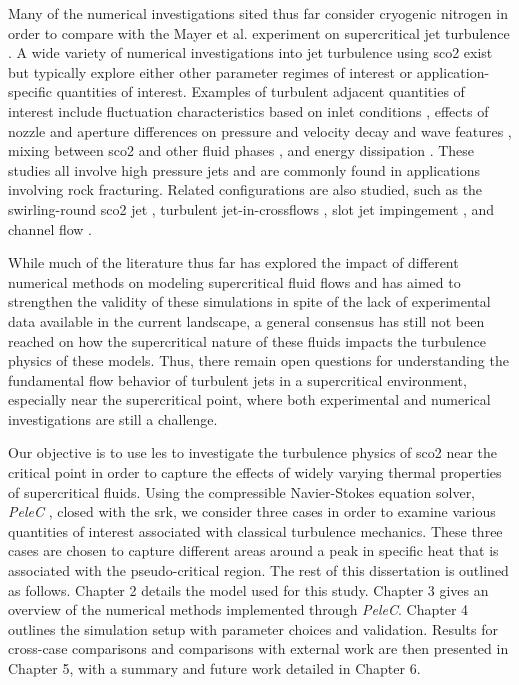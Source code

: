 Many of the numerical investigations sited thus far consider cryogenic nitrogen in order to compare with the Mayer et al. experiment on supercritical jet turbulence \cite{mayer2003raman}. A wide variety of numerical investigations into jet turbulence using \gls{sco2} exist but typically explore either other parameter regimes of interest or application-specific quantities of interest. Examples of turbulent adjacent quantities of interest include fluctuation characteristics based on inlet conditions \cite{ZHANG2022124125}, effects of nozzle and aperture differences on pressure and velocity decay \cite{en13102627} and wave features \cite{LIU2021108422}, mixing between \gls{sco2} and other fluid phases \cite{RAMAN2018}, and energy dissipation \cite{LI2020103650}. These studies all involve high pressure jets and are commonly found in applications involving rock fracturing. Related configurations are also studied, such as the swirling-round \gls{sco2} jet \cite{en14010106}, turbulent jet-in-crossflows \cite{ZHANG2022}, slot jet impingement \cite{ALKANDARI2022122949}, and channel flow \cite{ROGALEV2020}.

While much of the literature thus far has explored the impact of different numerical methods on modeling supercritical fluid flows and has aimed to strengthen the validity of these simulations in spite of the lack of experimental data available in the current landscape, a general consensus has still not been reached on how the supercritical nature of these fluids impacts the turbulence physics of these models. Thus, there remain open questions for understanding the fundamental flow behavior of turbulent jets in a supercritical environment, especially near the supercritical point, where both experimental and numerical investigations are still a challenge.

Our objective is to use \gls{les} to investigate the turbulence physics of \gls{sco2} near the critical point in order to capture the effects of widely varying thermal properties of supercritical fluids. Using the compressible Navier-Stokes equation solver, \textit{PeleC} \cite{PeleC1, PeleC2}, closed with the \gls{srk}, we consider three cases in order to examine various quantities of interest associated with classical turbulence mechanics. These three cases are chosen to capture different areas around a peak in specific heat that is associated with the pseudo-critical region. The rest of this dissertation is outlined as follows. Chapter 2 details the model used for this study. Chapter 3 gives an overview of the numerical methods implemented through \textit{PeleC}. Chapter 4 outlines the simulation setup with parameter choices and validation. Results for cross-case comparisons and comparisons with external work are then presented in Chapter 5, with a summary and future work detailed in Chapter 6. 





